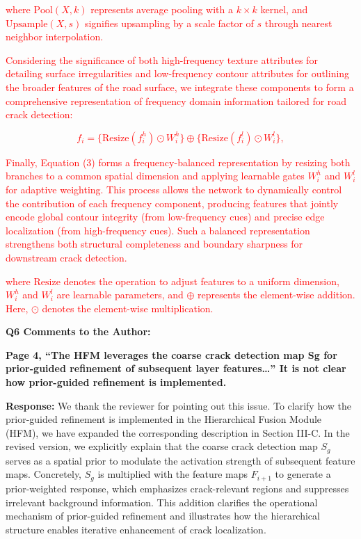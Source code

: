 \documentclass[lettersize,journal,onecolumn,12pt]{IEEEtran}
\begin{document}
\textcolor{red}{where $\text{Pool}(X, k)$ represents average pooling with a $k \times k$ kernel, and $\text{Upsample}(X, s)$ signifies upsampling by a scale factor of $s$ through nearest neighbor interpolation. }

\textcolor{red}{Considering the significance of both high-frequency texture attributes for detailing surface irregularities and low-frequency contour attributes for outlining the broader features of the road surface, we integrate these components to form a comprehensive representation of frequency domain information tailored for road crack detection:}

\textcolor{red}{
\begin{equation}
f_i = \{ \text{Resize}(f^{h}_{i}) \odot W^{h}_{i} \} \oplus  \{ \text{Resize}(f^{l}_{i})  \odot W^{l}_{i}  
 \},
\end{equation}
}

\textcolor{red}{Finally, Equation (3) forms a frequency-balanced representation by resizing both branches to a common spatial dimension and applying learnable gates $W^{h}_{i}$ and $W^{l}_{i}$ for adaptive weighting. 
This process allows the network to dynamically control the contribution of each frequency component, producing features that jointly encode global contour integrity (from low-frequency cues) and precise edge localization (from high-frequency cues). 
Such a balanced representation strengthens both structural completeness and boundary sharpness for downstream crack detection.}

\textcolor{red}{where $\text{Resize}$ denotes the operation to adjust features to a uniform dimension, $W^{h}_{i}$ and $W^{l}_{i}$ are learnable parameters, and $\oplus$ represents the element-wise addition. 
\textcolor{red}{Here, $\odot$ denotes the element-wise multiplication.}}\\ [10pt]


\clearpage


{\color{BlueGreen} \textbf{Q6 Comments to the Author:}

\textbf{Page 4, “The HFM leverages the coarse crack detection map Sg for prior-guided refinement of subsequent layer features…”
It is not clear how prior-guided refinement is implemented.}} 

\textbf{Response:}
We thank the reviewer for pointing out this issue. 
To clarify how the prior-guided refinement is implemented in the Hierarchical Fusion Module (HFM), we have expanded the corresponding description in Section III-C. 
In the revised version, we explicitly explain that the coarse crack detection map $S_g$ serves as a spatial prior to modulate the activation strength of subsequent feature maps. 
Concretely, $S_g$ is multiplied with the feature maps $F_{i+1}$ to generate a prior-weighted response, which emphasizes crack-relevant regions and suppresses irrelevant background information. 
This addition clarifies the operational mechanism of prior-guided refinement and illustrates how the hierarchical structure enables iterative enhancement of crack localization. 
\end{document}
